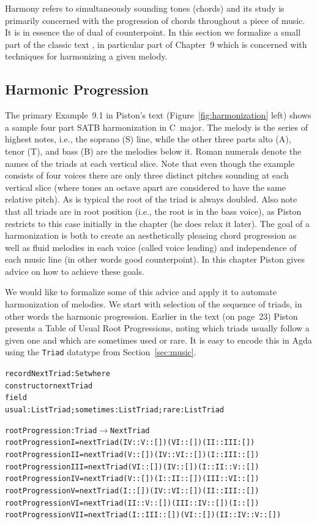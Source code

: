 Harmony refers to simultaneously sounding tones (chords) and its study
is primarily concerned with the progression of chords throughout a
piece of music. It is in essence the of dual of counterpoint. In this
section we formalize a small part of the classic text
\citet{piston-harmony}, in particular part of Chapter~9 which is
concerned with techniques for harmonizing a given melody.

\subsection{Harmonic Progression}
\label{sec:harmony:prog}

The primary Example~9.1 in Piston's text
(Figure~\ref{fig:harmonization} left) shows a
sample four part SATB harmonization in C~major. The melody is the
series of highest notes, i.e., the soprano (S) line, while the other three
parts alto (A), tenor (T), and bass (B) are the melodies below
it. Roman numerals denote the names of the triads at each vertical
slice. Note that even though the example consists of four voices there are only
three distinct pitches sounding at each vertical slice (where tones an
octave apart are considered to have the same relative pitch). As is
typical the root of the triad is always doubled. Also note that all
triads are in root position (i.e., the root is in the bass voice),
as Piston restricts to this case initially in the chapter (he does
relax it later). The goal of a harmonization is both to create an
aesthetically pleasing chord progression as well as fluid melodies in
each voice (called voice leading) and independence of each music
line (in other words good counterpoint). In this chapter
Piston gives advice on how to achieve these goals.

\Harmonization

We would like to formalize some of this advice and apply it to
automate harmonization of melodies. We start with selection of the
sequence of triads, in other words the harmonic progression. Earlier
in the text (on page~23) Piston presents a Table of Usual Root
Progressions, noting which triads usually follow a given one and
which are sometimes used or rare. It is easy to encode this in Agda
using the \texttt{Triad} datatype from Section~\ref{sec:music}.

\begin{alltt}
record NextTriad : Set where
  constructor nextTriad
  field
    usual : List Triad; sometimes : List Triad; rare : List Triad

rootProgression : Triad \(\rightarrow\) NextTriad
rootProgression I   = nextTriad (IV :: V :: []) (VI :: []) (II  :: III : [])
rootProgression II  = nextTriad (V :: []) (IV :: VI :: []) (I :: III :: [])
rootProgression III = nextTriad (VI :: []) (IV :: []) (I :: II :: V :: [])
rootProgression IV  = nextTriad (V :: []) (I :: II :: []) (III :: VI :: [])
rootProgression V   = nextTriad (I :: []) (IV :: VI :: []) (II :: III :: [])
rootProgression VI  = nextTriad (II :: V :: []) (III :: IV :: []) (I :: [])
rootProgression VII = nextTriad (I  :: III :: []) (VI :: []) (II :: IV  :: V :: [])
\end{alltt}

